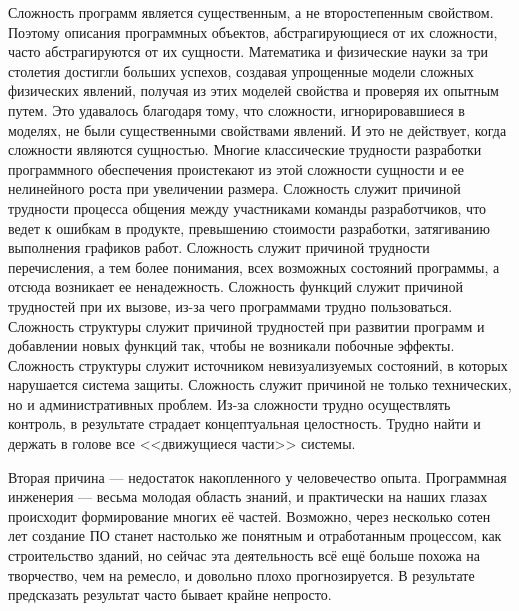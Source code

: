 \documentclass{../../text-style}
\begin{document}
Сложность программ является существенным, а не второстепенным свойством. Поэтому описания программных объектов, абстрагирующиеся от их сложности, часто абстрагируются от их сущности. Математика и физические науки за три столетия достигли больших успехов, создавая упрощенные модели сложных физических явлений, получая из этих моделей свойства и проверяя их опытным путем. Это удавалось благодаря тому, что сложности, игнорировавшиеся в моделях, не были существенными свойствами явлений. И это не действует, когда сложности являются сущностью. Многие классические трудности разработки программного обеспечения проистекают из этой сложности сущности и ее нелинейного роста при увеличении размера. Сложность служит причиной трудности процесса общения между участниками команды разработчиков, что ведет к ошибкам в продукте, превышению стоимости разработки, затягиванию выполнения графиков работ. Сложность служит причиной трудности перечисления, а тем более понимания, всех возможных состояний программы, а отсюда возникает ее ненадежность. Сложность функций служит причиной трудностей при их вызове, из-за чего программами трудно пользоваться. Сложность структуры служит причиной трудностей при развитии программ и добавлении новых функций так, чтобы не возникали побочные эффекты. Сложность структуры служит источником невизуализуемых состояний, в которых нарушается система защиты. Сложность служит причиной не только технических, но и административных проблем. Из-за сложности трудно осуществлять контроль, в результате страдает концептуальная целостность. Трудно найти и держать в голове все <<движущиеся части>> системы. 

Вторая причина --- недостаток накопленного у человечество опыта. Программная инженерия --- весьма молодая область знаний, и практически на наших глазах происходит формирование многих её частей. Возможно, через несколько сотен лет создание ПО станет настолько же понятным и отработанным процессом, как строительство зданий, но сейчас эта деятельность всё ещё больше похожа на творчество, чем на ремесло, и довольно плохо прогнозируется. В результате предсказать результат часто бывает крайне непросто.
\end{document}
